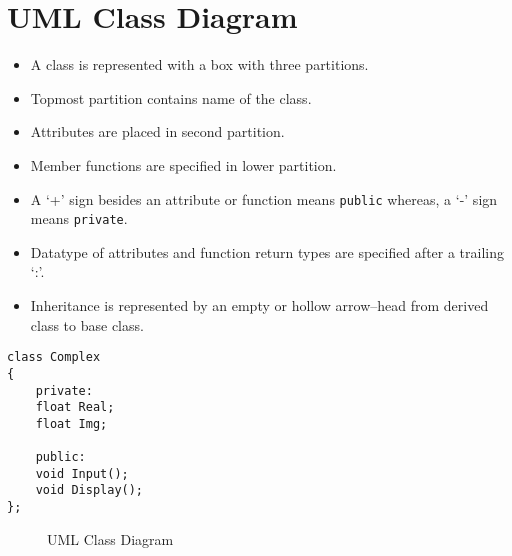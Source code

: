 \documentclass[12pt,a4paper]{article}
\begin{document}
\section{UML Class Diagram}
\begin{itemize}
\item A class is represented with a box with three partitions.
\item Topmost partition contains name of the class.
\item Attributes are placed in second partition.
\item Member functions are specified in lower partition.
\item A `+' sign besides an attribute or function means \verb|public| whereas, a `-' sign means \verb|private|.
\item Datatype of attributes and function return types are specified after a trailing `:'.
\item Inheritance is represented by an empty or hollow arrow--head from derived class to base class.
\end{itemize}
\begin{minipage}{0.5\textwidth}
\begin{lstlisting}[caption={Complex Class Definition}]
class Complex
{
	private:
	float Real;
	float Img;

	public:
	void Input();
	void Display();
};
\end{lstlisting}
\end{minipage}
\begin{minipage}{0.5\textwidth}
\begin{figure}[H]
\centering
\caption{UML Class Diagram}
\label{UML-Diagram-Complex-Class}
\end{figure}
\end{minipage}
\nocite{*}


\end{document}
